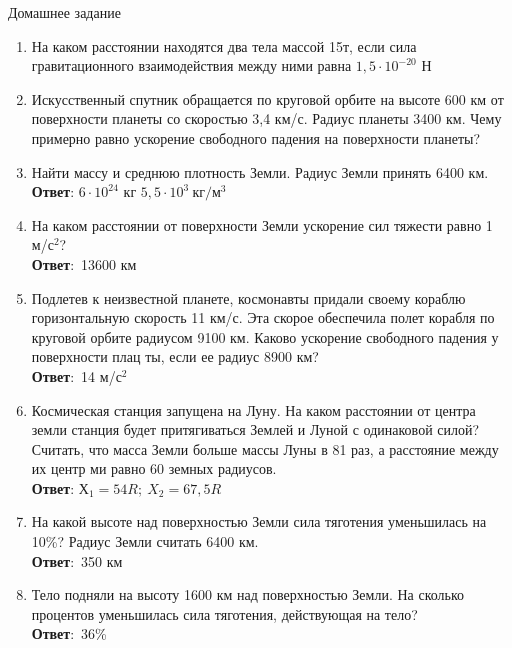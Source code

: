 \documentclass[a6paper, 11pt]{diss_4}
\renewcommand{\'}{\,'}
\begin{document}
\begin{center}
   Домашнее задание
\end{center}
\begin{enumerate}

  \item На каком расстоянии находятся два тела массой 15т, если сила
гравитационного взаимодействия между ними равна $1,5\cdot10^{-20}$ Н

  \item Искусственный спутник обращается по круговой орбите на высоте 600 км от
 поверхности планеты со скоростью 3,4 км/с. Радиус планеты 3400 км. Чему
примерно равно ускорение свободного падения на поверхности планеты?

  \item Найти массу и среднюю плотность Земли. Радиус Земли принять 6400 км.
\\\textbf{Ответ}: $6\cdot10^{24}$ кг $5,5\cdot10^3\ кг/м^3$

  \item На каком расстоянии от поверхности Земли ускорение сил тяжести равно 1
м/$с^2$?\\\textbf{Ответ}:\ 13600 км

  \item Подлетев к неизвестной планете, космонавты придали своему кораблю
горизонтальную скорость 11 км/с. Эта скорое обеспечила полет корабля по
круговой орбите радиусом 9100 км. Каково ускорение свободного падения у
поверхности плац ты, если ее радиус 8900 км?\\\textbf{Ответ}:\ 14 м/$с^2$

  \item Космическая станция запущена на Луну. На каком расстоянии от центра
земли станция будет притягиваться Землей и Луной с одинаковой силой? Считать,
что масса Земли больше массы Луны в 81 раз, а расстояние между их центр ми
равно 60 земных радиусов.\\\textbf{Ответ}: $Х_1=54R;\ X_2=67,5R$

  \item На какой высоте над поверхностью Земли сила тяготения уменьшилась на
10\%? Радиус Земли считать 6400 км.\\\textbf{Ответ}:\ 350 км

  \item Тело подняли на высоту 1600 км над поверхностью Земли. На сколько
процентов уменьшилась сила тяготения, действующая на тело?\\\textbf{Ответ}:\
36\%

\end{enumerate}
\end{document}
